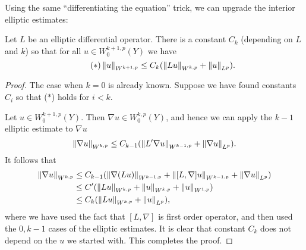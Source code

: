 \documentclass{amsart}
\begin{document}
   Using the same ``differentiating the equation'' trick, we can
   upgrade the interior elliptic estimates:
   \begin{thm}
     Let $L$ be an elliptic differential operator. There is a constant
     $C_{k}$ (depending on $L$ and $k$) so that for all
     $u\in W^{k+1,p}_{0}(Y)$ we have
     \begin{equation*}\tag{$\ast$}
       \left\lVert u\right\rVert_{W^{k+1,p}}\le C_{k}(\left\lVert Lu\right\rVert_{W^{k,p}}+\left\lVert u\right\rVert_{L^{p}}).
     \end{equation*}
   \end{thm}
   \begin{proof}
     The case when $k=0$ is already known. Suppose we have found
     constants $C_{i}$ so that ($\ast$) holds for $i<k$.

     Let $u\in W^{k+1,p}_{0}(Y)$. Then $\nabla u\in W^{k,p}_{0}(Y)$,
     and hence we can apply the $k-1$ elliptic estimate to $\nabla u$
     \begin{equation*}
       \left\lVert\nabla u\right\rVert_{W^{k,p}}\le C_{k-1}(\left\lVert L'\nabla
         u\right\rVert_{W^{k-1,p}}+\left\lVert\nabla u\right\rVert_{L^{p}}).
     \end{equation*}
     It follows that
     \begin{equation*}
       \begin{aligned}
       \left\lVert\nabla u\right\rVert_{W^{k,p}}&\le C_{k-1}(\left\lVert\nabla
         (Lu)\right\rVert_{W^{k-1,p}}+\left\lVert[L,\nabla]u\right\rVert_{W^{k-1,p}}+\left\lVert\nabla
         u\right\rVert_{L^{p}})\\
       &\le
       C'(\left\lVert Lu\right\rVert_{W^{k,p}}+\left\lVert u\right\rVert_{W^{k,p}}+\left\lVert u\right\rVert_{W^{1,p}})\\
       &\le C_{k}(\left\lVert Lu\right\rVert_{W^{k,p}}+\left\lVert u\right\rVert_{L^{p}}),
     \end{aligned}     
   \end{equation*}
   where we have used the fact that $[L,\nabla]$ is first order
   operator, and then used the $0,k-1$ cases of the elliptic
   estimates. It is clear that constant $C_{k}$ does not depend on the
   $u$ we started with. This completes the proof.   
 \end{proof}
\end{document}
